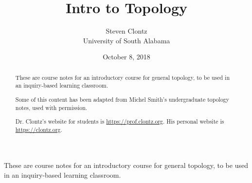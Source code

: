 \documentclass[10pt,]{article}
\title{Intro to Topology}
\author{Steven Clontz\\
University of South Alabama
}
\date{October 8, 2018}
\begin{document}
\hypertarget{index}{}
\maketitle
\thispagestyle{empty}
\begin{abstract}
\hypertarget{p-1}{}%
These are course notes for an introductory course for general topology, to be used in an inquiry-based learning classroom.%
\par
\hypertarget{p-2}{}%
Some of this content has been adapted from Michel Smith's undergraduate topology notes, used with permission.%
\par
\hypertarget{p-3}{}%
Dr. Clontz's website for students is \url{https://prof.clontz.org}. His personal website is \url{https://clontz.org}.%
\end{abstract}
\hypertarget{p-4}{}%
These are course notes for an introductory course for general topology, to be used in an inquiry-based learning classroom.%
%
%
\typeout{************************************************}
\typeout{************************************************}
%
\end{document}
